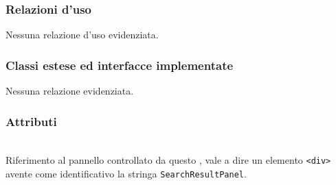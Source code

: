 \subsubsection*{Relazioni d'uso}
Nessuna relazione d'uso evidenziata.

\subsubsection*{Classi estese ed interfacce implementate}
Nessuna relazione evidenziata.

\subsubsection*{Attributi}
\begin{description}
\item{}\\
Riferimento al pannello controllato da questo , vale a dire un elemento \verb'<div>' avente come identificativo la stringa \verb'SearchResultPanel'.
\end{description}

